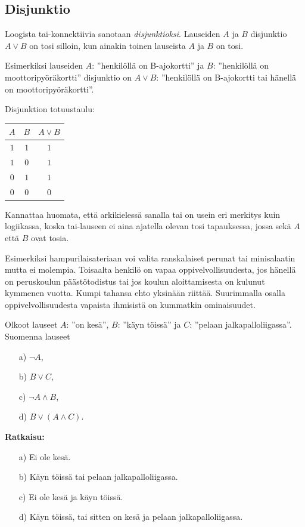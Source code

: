 \bigskip

\subsection*{Disjunktio} Loogista tai-konnektiivia sanotaan {\em disjunktioksi}. Lauseiden $A$ ja $B$ disjunktio $A\lor B$ on tosi silloin, kun ainakin toinen lauseista $A$ ja $B$ on tosi.


Esimerkiksi lauseiden $A$: ''henkilöllä on B-ajokortti'' ja $B$: ''henkilöllä on moottoripyöräkortti'' disjunktio on $A \lor B$: ''henkilöllä on B-ajokortti tai hänellä on moottoripyöräkortti''. 

Disjunktion totuustaulu:
 
\bigskip

\begin{center}
\begin{tabular}{|c|c|c|}\hline
$A$ & $B$ & $A\lor B$ \\ \hline
$1$ & $1$ & $1$\\ 
$1$ & $0$ & $1$\\
$0$ & $1$ & $1$\\
$0$ & $0$ & $0$\\ \hline
\end{tabular}
\end{center}

\bigskip

Kannattaa huomata, että arkikielessä sanalla tai on usein eri merkitys kuin logiikassa, koska tai-lauseen ei aina ajatella olevan tosi tapauksessa, jossa sekä $A$ että $B$ ovat tosia.

Esimerkiksi hampurilaisateriaan voi valita ranskalaiset perunat tai minisalaatin mutta ei molempia. Toisaalta henkilö on vapaa oppivelvollisuudesta, jos hänellä on peruskoulun päästötodistus tai jos koulun aloittamisesta on kulunut kymmenen vuotta. Kumpi tahansa ehto yksinään riittää. Suurimmalla osalla oppivelvollisuudesta vapaista ihmisistä on kummatkin ominaisuudet.

\begin{esimerkki}
Olkoot lauseet $A$: ''on kesä'', $B$: ''käyn töissä'' ja $C$: ''pelaan jalkapalloliigassa''. Suomenna lauseet
\begin{itemize}
\item[a)] $\lnot A$, 
\item[b)] $B\lor C$,
\item[c)] $\lnot A\land B$,
\item[d)] $B\lor (A\land C)$.
\end{itemize}

{\bf Ratkaisu:}
\begin{itemize}
\item[a)] Ei ole kesä.
\item[b)] Käyn töissä tai pelaan jalkapalloliigassa.
\item[c)] Ei ole kesä ja käyn töissä.
\item[d)] Käyn töissä, tai sitten on kesä ja pelaan jalkapalloliigassa.
\end{itemize}
\end{esimerkki}


